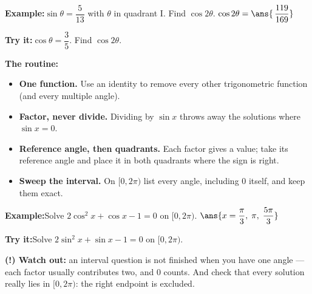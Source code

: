 \documentclass[12pt]{article}
\begin{document}
\begin{examplebox}
\textbf{Example:}\quad $\sin\theta = \dfrac{5}{13}$ with $\theta$ in quadrant
I. Find $\cos 2\theta$.
$\cos 2\theta = \ans{\,\dfrac{119}{169}}$
\end{examplebox}

\begin{tryitbox}
\textbf{Try it:}\quad $\cos\theta = \dfrac{3}{5}$. Find $\cos 2\theta$.\\[2pt]
\end{tryitbox}


\begin{formulabox}
\textbf{The routine:}
\begin{itemize}[leftmargin=0.8cm, itemsep=1pt, topsep=1pt]
  \item \textbf{One function.} Use an identity to remove every other
        trigonometric function (and every multiple angle).
  \item \textbf{Factor, never divide.} Dividing by $\sin x$ throws away the
        solutions where $\sin x = 0$.
  \item \textbf{Reference angle, then quadrants.} Each factor gives a value;
        take its reference angle and place it in both quadrants where the sign
        is right.
  \item \textbf{Sweep the interval.} On $[0, 2\pi)$ list every angle, including
        $0$ itself, and keep them exact.
\end{itemize}
\end{formulabox}

\begin{examplebox}
\textbf{Example:}\quad Solve $2\cos^2 x + \cos x - 1 = 0$ on $[0, 2\pi)$.
$\ans{x = \dfrac{\pi}{3}, \; \pi, \; \dfrac{5\pi}{3}}$
\end{examplebox}

\begin{tryitbox}
\textbf{Try it:}\quad Solve $2\sin^2 x + \sin x - 1 = 0$ on $[0, 2\pi)$.\\[2pt]
\end{tryitbox}

\begin{watchoutbox}
\textbf{(!) Watch out:} an interval question is not finished when you have one
angle --- each factor usually contributes two, and $0$ counts. And check that
every solution really lies in $[0, 2\pi)$: the right endpoint is excluded.
\end{watchoutbox}
\end{document}
